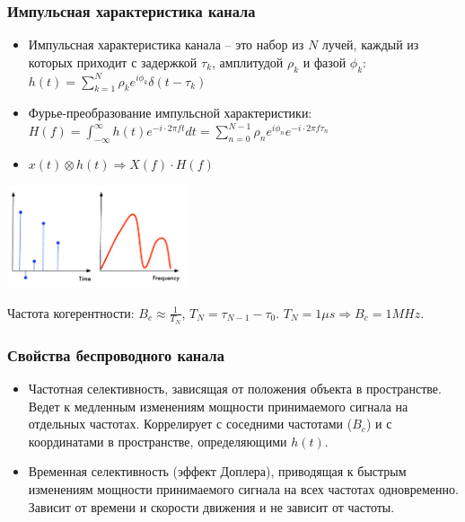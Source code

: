 \documentclass[utf8]{beamer}
\begin{document}
\begin{frame}
\frametitle{Импульсная характеристика канала}
\begin{itemize}
        \item Импульсная характеристика канала -- это набор из $N$ лучей, каждый из которых приходит с задержкой $\tau_k$, амплитудой $\rho_k$ и фазой $\phi_k$: $h(t) = \sum_{k=1}^N \rho_k e^{i\phi_k}\delta(t-\tau_k)$
        \item Фурье-преобразование импульсной характеристики:
$H(f) = \int_{-\infty}^{\infty}h(t) e^{-i\cdot 2\pi ft}dt = \sum_{n=0}^{N-1} \rho_n e^{i\phi_n}  e^{-i\cdot 2\pi f \tau_n}$
        \item $x(t)\otimes h(t) \Rightarrow X(f)\cdot H(f) $
\end{itemize}
\begin{center}
\includegraphics[width=0.4\textwidth]{pics/multipath.pdf}
\end{center}
Частота когерентности: $B_c \approx \frac{1}{T_N}$, $T_N = \tau_{N-1} - \tau_0$. $T_N=1 \mu s \Rightarrow B_c = 1 MHz$.
\end{frame}
\begin{frame}
\frametitle{Свойства беспроводного канала}
\begin{itemize}
        \item Частотная селективность, зависящая от положения объекта в пространстве. Ведет к медленным изменениям мощности принимаемого сигнала на отдельных частотах. Коррелирует с соседними частотами ($B_c$) и с координатами в пространстве, определяющими $h(t)$.
        \item Временная селективность (эффект Доплера), приводящая к быстрым изменениям мощности принимаемого сигнала на всех частотах одновременно. Зависит от времени и скорости движения и не зависит от частоты.
\end{itemize}
\end{frame}
\end{document}

